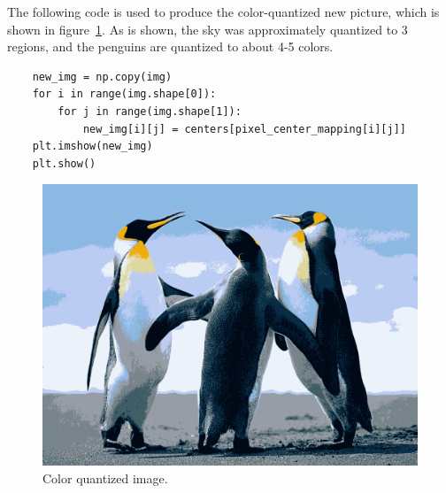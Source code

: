 \documentclass{article}
\begin{document}
The following code is used to produce the color-quantized new picture, which is shown in figure~\ref{fig:1_new_penguin}. As is shown, the sky was approximately quantized to 3 regions, and the penguins are quantized to about 4-5 colors. 
\begin{lstlisting}
	new_img = np.copy(img)
	for i in range(img.shape[0]):
		for j in range(img.shape[1]):
			new_img[i][j] = centers[pixel_center_mapping[i][j]]
	plt.imshow(new_img)
	plt.show()
\end{lstlisting}

\begin{figure}[h!]
\centering
\includegraphics[width=0.6\linewidth]{../images/1_new_penguin.png}
\caption{Color quantized image.}
\label{fig:1_new_penguin}
\end{figure}
\end{document}
